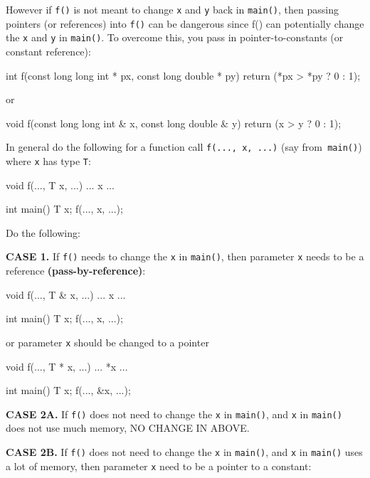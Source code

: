 However if \texttt{f()} is not meant to change \texttt{x} and \texttt{y} back in \texttt{main()}, then passing pointers (or references) into \texttt{f()} can be dangerous since f() can potentially change the \texttt{x} and \texttt{y} in \texttt{main()}. To overcome this, you pass in pointer-to-constants (or constant reference):

\begin{consolethree}[escapeinside=||]
int f(const long long int * px,
      const long double * py)
{
    return (*px > *py ? 0 : 1);
}
\end{consolethree}
or

\begin{consolethree}[escapeinside=||]
void f(const long long int & x,
       const long double & y)
{
    return (x > y ? 0 : 1);
}
\end{consolethree}

In general do the following for a function call \texttt{f(..., x, ...)} (say from\texttt{ main()}) where \texttt{x} has type \texttt{T}:

\begin{consolethree}[escapeinside=||]
void f(..., T x, ...)
{
    ... x ...
}

int main()
{
    T x;
    f(..., x, ...);
}
\end{consolethree}
Do the following:

\textbf{CASE 1.} If \texttt{f()} needs to change the \texttt{x} in \texttt{main()}, then parameter \texttt{x} needs to be a reference \textbf{(pass-by-reference)}:

\begin{consolethree}[escapeinside=||]
void f(..., T & x, ...)
{
    ... x ...
}

int main()
{
    T x;
    f(..., x, ...);
}
\end{consolethree}
or parameter \texttt{x} should be changed to a pointer

\begin{consolethree}[escapeinside=||]
void f(..., T * x, ...)
{
    ... *x ...
}

int main()
{
    T x;
    f(..., &x, ...);
}
\end{consolethree}
\textbf{CASE 2A.} If \texttt{f()} does not need to change the \texttt{x} in \texttt{main()}, and \texttt{x} in \texttt{main()} does not use much memory, NO CHANGE IN ABOVE.

\textbf{CASE 2B.} If \texttt{f()} does not need to change the \texttt{x} in \texttt{main()}, and \texttt{x} in \texttt{main()} uses a lot of memory, then parameter \texttt{x} need to be a pointer to a constant:

